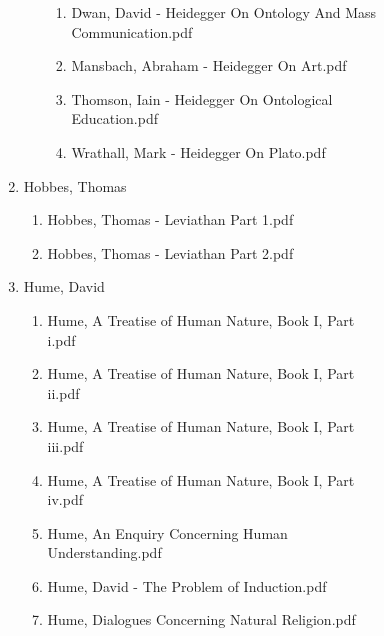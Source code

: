 \documentclass[11pt]{article}
\begin{document}
\begin{enumerate}
\begin{enumerate}
\begin{enumerate}
\begin{enumerate}
\begin{enumerate}
\begin{enumerate}
\begin{enumerate}
\begin{enumerate}
\item Dwan, David - Heidegger On Ontology And Mass Communication.pdf
\label{sec-1-1-1-1-7-3-39-13-37-2-2}

\item Mansbach, Abraham - Heidegger On Art.pdf
\label{sec-1-1-1-1-7-3-39-13-37-2-3}

\item Thomson, Iain - Heidegger On Ontological Education.pdf
\label{sec-1-1-1-1-7-3-39-13-37-2-4}

\item Wrathall, Mark - Heidegger On Plato.pdf
\label{sec-1-1-1-1-7-3-39-13-37-2-5}
\end{enumerate}
\end{enumerate}

\item Hobbes, Thomas
\label{sec-1-1-1-1-7-3-39-13-38}
\begin{enumerate}
\item Hobbes, Thomas - Leviathan Part 1.pdf
\label{sec-1-1-1-1-7-3-39-13-38-1}

\item Hobbes, Thomas - Leviathan Part 2.pdf
\label{sec-1-1-1-1-7-3-39-13-38-2}
\end{enumerate}

\item Hume, David
\label{sec-1-1-1-1-7-3-39-13-39}
\begin{enumerate}
\item Hume, A Treatise of Human Nature, Book I, Part i.pdf
\label{sec-1-1-1-1-7-3-39-13-39-1}

\item Hume, A Treatise of Human Nature, Book I, Part ii.pdf
\label{sec-1-1-1-1-7-3-39-13-39-2}

\item Hume, A Treatise of Human Nature, Book I, Part iii.pdf
\label{sec-1-1-1-1-7-3-39-13-39-3}

\item Hume, A Treatise of Human Nature, Book I, Part iv.pdf
\label{sec-1-1-1-1-7-3-39-13-39-4}

\item Hume, An Enquiry Concerning Human Understanding.pdf
\label{sec-1-1-1-1-7-3-39-13-39-5}

\item Hume, David - The Problem of Induction.pdf
\label{sec-1-1-1-1-7-3-39-13-39-6}

\item Hume, Dialogues Concerning Natural Religion.pdf
\label{sec-1-1-1-1-7-3-39-13-39-7}
\end{enumerate}


\end{enumerate}
\end{enumerate}
\end{enumerate}
\end{enumerate}
\end{enumerate}
\end{enumerate}
\end{document}
